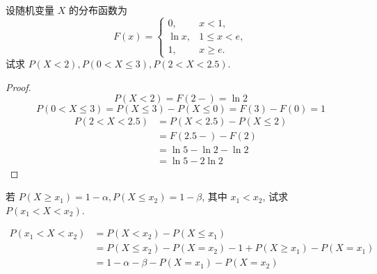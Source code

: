 \documentclass[../main.tex]{subfiles}
\begin{document}
\begin{exercise}{}{}
设随机变量 $X$ 的分布函数为
\[
F(x) = \begin{cases} 0, & x < 1, \\ \ln x, & 1 \le x < e, \\ 1, & x \ge e. \end{cases}
\]
试求 $P(X < 2), P(0 < X \le 3), P(2 < X < 2.5)$.
\end{exercise}
\begin{proof}
     \[
     P\left( X< 2 \right)= F\left( 2 - \right)= \ln 2  
     \] \[
     P\left( 0< X\le 3 \right)= P\left( X\le 3 \right)-P\left( X\le 0 \right)=F\left( 3 \right)-F\left( 0 \right)=    1   
     \] \[
     \begin{aligned}
     P\left( 2< X< 2.5 \right)&= P\left( X< 2.5 \right)-P\left( X\le 2 \right)\\ 
      &= F\left( 2.5- \right)-F\left( 2 \right)\\ 
       &= \ln 5-\ln 2-\ln 2\\ 
        &= \ln 5-2\ln 2 
     \end{aligned}
     \]
\end{proof}
\begin{exercise}{}{}
若 $P(X \ge x_1) = 1-\alpha, P(X \le x_2) = 1-\beta$, 其中 $x_1 < x_2$, 试求 $P(x_1 < X < x_2)$.
\end{exercise}
\begin{solution}
    \[
    \begin{aligned}
    P\left( x_1< X< x_2 \right)&= P\left( X< x_2 \right)-P\left( X\le x_1 \right)\\ 
     &=     P\left( X\le x_2 \right)-P\left( X= x_2 \right)-1+ P\left( X\ge  x_1 \right)   -P\left( X= x_1 \right) \\ 
      &= 1-\alpha -\beta -P\left( X= x_1 \right)-P\left( X= x_2 \right)  
    \end{aligned}
    \]
\end{solution}
\end{document}
